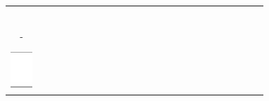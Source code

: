 \documentclass[10pt]{article}
\begin{document}
\begin{center}
\begin{tabular}{|c|c|c|c|c|c|c|c|c|c|c|c|c|c|c|c|c|c|c|c|c|c|c|c|}
 &  &  &  &  &  &  &  &  &  &  &  &  &  &  &  &  &  &  &  &  &  &  &  \\
\hline
 &  &  &  &  &  &  &  &  &  &  &  &  &  &  &  &  &  &  &  &  &  &  &  \\
\hline
 &  &  &  &  &  &  &  &  &  &  &  &  &  &  &  &  &  &  &  &  &  &  &  \\
\hline
 &  &  &  &  &  &  &  &  &  &  &  &  &  &  &  &  &  &  &  &  &  &  &  \\
\hline
 &  &  &  &  &  &  &  &  &  &  &  &  &  &  &  &  &  &  &  &  &  &  &  \\
\hline
 &  &  &  &  &  &  &  &  &  &  &  &  &  &  &  &  &  &  &  &  &  &  &  \\
\hline
 &  &  &  &  &  &  &  &  &  &  &  &  &  &  &  &  &  &  &  &  &  &  &  \\
\hline
- &  &  &  &  &  &  &  &  &  &  &  &  &  &  &  &  &  &  &  &  &  &  &  \\
\hline
 &  &  &  &  &  &  &  &  &  &  &  &  &  &  &  &  &  &  &  &  &  &  &  \\
\hline
\includegraphics[max width=\textwidth]{2024_11_21_439e1d90cd1e7f928ae2g-15}

\end{tabular}
\end{center}
\end{document}
